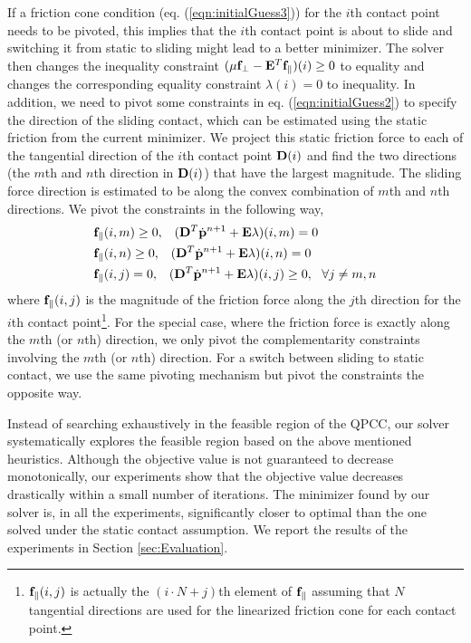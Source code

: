 If a friction cone condition (eq. (\ref{eqn:initialGuess3})) for the
$i$th contact point needs to be pivoted, this implies that the $i$th contact point is about to slide and switching it from static to sliding might lead to a better minimizer. The solver then changes the inequality constraint $(\mu \mathbf{f}_{\perp} - \mathbf{E}^T \mathbf{f}_{\parallel})(i)\geq 0$ to equality and changes the corresponding equality constraint $\lambda(i)=0$ to inequality. In addition, we need to pivot some constraints in eq. (\ref{eqn:initialGuess2}) to specify the direction of the sliding contact, which can be estimated using the static friction from the current minimizer. We project this static friction force to each of the tangential direction of the $i$th contact point $\mathbf{D}(i)$ and find the two directions (the $m$th and $n$th direction in $\mathbf{D}(i)$) that have the largest magnitude. The sliding force direction is estimated to be along the convex combination of $m$th and $n$th directions. We pivot the constraints in the following way,
\begin{align}
& \mathbf{f}_{\parallel}(i, m)\geq 0, \;\;\; (\mathbf{D}^T \dot{\mathbf{p}}^{n+1} + \mathbf{E} \lambda)(i, m) = 0 \nonumber \\
& \mathbf{f}_{\parallel}(i, n)\geq 0, \;\;\; (\mathbf{D}^T \dot{\mathbf{p}}^{n+1} + \mathbf{E} \lambda)(i, n) = 0\nonumber \\
& \mathbf{f}_{\parallel}(i, j) = 0, \;\;\;(\mathbf{D}^T \dot{\mathbf{p}}^{n+1} + \mathbf{E} \lambda)(i, j) \geq 0, ~~\forall j \neq m, n\nonumber
\label{eqn:staticSlidePivot}
\end{align}
where $\mathbf{f}_{\parallel}(i, j)$ is the magnitude of the friction force
along the $j$th direction for the $i$th contact
point\footnote{$\mathbf{f}_{\parallel}(i, j)$ is actually the $(i\cdot N+j)$th
element of $\mathbf{f}_{\parallel}$ assuming that $N$ tangential directions
are used for the linearized friction cone for each contact point.}. For
the special case, where the friction force is exactly along the $m$th (or
$n$th) direction, we only pivot the complementarity constraints involving
the $m$th (or $n$th) direction. For a switch between sliding to static
contact, we use the same pivoting mechanism but pivot the constraints the
opposite way.

Instead of searching exhaustively in the feasible region of the QPCC, our
solver systematically explores the feasible region based on the above
mentioned heuristics. Although the objective value is not guaranteed to
decrease monotonically, our experiments show that the objective value
decreases drastically within a small number of iterations. The minimizer
found by our solver is, in all the experiments, significantly closer to
optimal than the one solved under the static contact assumption. We report the
results of the experiments in Section \ref{sec:Evaluation}.

